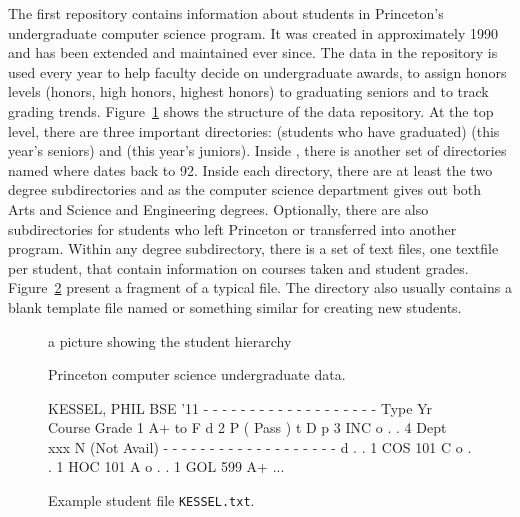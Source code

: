 \documentclass[natbib]{sigplanconf}
\begin{document}
The first repository contains information about students in
Princeton's undergraduate computer science program.  It was
created in approximately 1990 and has been extended and
maintained ever since.  The data in the repository is used
every year to help faculty decide on undergraduate awards,
to assign honors levels (honors, high honors, highest honors)
to graduating seniors and to track grading trends.
Figure~\ref{fig:student-pic} shows the
structure of the data repository.  At the top level, there are
three important directories:  (students who have graduated)
 (this year's seniors) and  (this year's juniors).
Inside , there is another set of directories named 
 where  dates back to 92.  Inside each  
directory, there are at least the 
two degree subdirectories  and  as
the computer science department gives out both Arts and Science
and Engineering degrees.  Optionally, there are also subdirectories for
students who left Princeton or transferred into another program. 
Within any degree subdirectory, there is a set of text files, one
textfile per student, that contain information on courses taken and
student grades.  Figure~\ref{fig:student-file-example} present a fragment
of a typical file.  The directory also usually contains a blank template file
named  or something similar for creating new students.

\begin{figure}

a picture showing the student hierarchy

\caption{Princeton computer science undergraduate data.}
\label{fig:student-pic}
\end{figure}

\begin{figure}
\begin{code}
KESSEL, PHIL	   BSE   '11
- - - - - - - - - - - - - - - - - - -
Type    Yr  Course     Grade
         1             A+ to F
d        2             P  (  Pass )
t  D  p  3             INC
o  .  .  4  Dept  xxx  N  (Not Avail)
- - - - - - - - - - - - - - - - - - -
d  .  .  1  COS   101  C
o  .  .  1  HOC   101  A
o  .  .  1  GOL   599  A+
...
\end{code}
\caption{Example student file {\tt KESSEL.txt}.}
\label{fig:student-file-example}
\end{figure}
\end{document}
